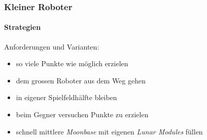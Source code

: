 \begin{frame}
	
	
	\frametitle{Kleiner Roboter}
	\framesubtitle{Strategien}
	Anforderungen und Varianten:
	\begin{itemize}
		\item so viele Punkte wie möglich erzielen %
		\item dem grossen Roboter aus dem Weg gehen
	\end{itemize}
	\begin{itemize}
		\item in eigener Spielfeldhälfte bleiben
		\item beim Gegner versuchen Punkte zu erzielen
		\item schnell mittlere \textit{Moonbase} mit eigenen \textit{Lunar Modules} füllen
	\end{itemize}
	
\end{frame}
